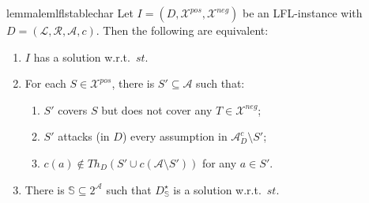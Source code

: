 \documentclass[letterpaper]{article} %
\newcommand{\stb}{\textit{st}}
\newcommand{\asms}{\asm}
\newcommand{\theory}{\mathit{Th}}
\newcommand{\asm}{\ensuremath{\mathcal{A}}}
\newcommand{\atoms}{\mathcal{L}}
\newcommand{\ruleset}{\mathcal{R}}
\newcommand{\assumptions}{\mathcal{A}}
\newcommand{\contra}{c}
\newcommand{\contrary}[1]{c(#1)}
\newcommand{\ABAdef}{D=(\atoms,\ruleset,\assumptions,\contra)}
\newcommand{\setS}{\mathbb{S}}
\newcommand{\contraryAF}[1]{F^{c}_{#1}}
\newcommand{\contraryArgs}[1]{\asm^{c}_{#1}}
\newcommand{\Xpos}{\mathcal{X}^{pos}}
\newcommand{\Xneg}{\mathcal{X}^{neg}}
\begin{document}
\begin{restatable}{lemma}{lemlflstablechar}
   \label{lem:lfl-stable-char}
%
Let $I=(D,\Xpos,\Xneg)$ be an LFL-instance with $\ABAdef$. Then the following are equivalent:
\begin{enumerate}
    \item $I$ has a solution w.r.t.~$\stb$.
    \item For each $S\in \Xpos$, there is $S'\subseteq \mathcal{A}$ such that:
%
\begin{enumerate}[label=(\roman*),labelwidth=*, labelsep=0.5em, align=left]
\item $S'$ covers $S$ but does not cover any $T\in \Xneg$;
\item $S'$ attacks (in $D$) every assumption in $\contraryArgs{D}\setminus S'$;
\item $\contrary{a}\notin \theory_D(S'\cup c(\asms\setminus S'))$ for any $a\in S'$. 

\end{enumerate}
\item There is $\setS\subseteq 2^\asms$ such that $D_\setS^\star$ is a solution w.r.t.~$\stb$.

\end{enumerate}

\end{restatable}
\end{document}
